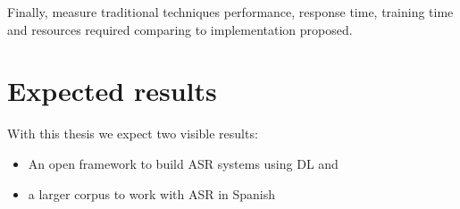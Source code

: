 Finally, measure traditional techniques performance, response time, training time and resources required comparing to implementation proposed.

\section{Expected results}

With this thesis we expect two visible results:

\begin{itemize}
    \item An open framework to build ASR systems using DL and
    \item a larger corpus to work with ASR in Spanish
\end{itemize}




